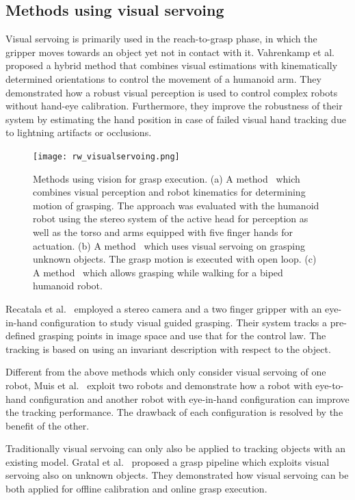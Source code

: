 \subsection{Methods using visual servoing} 
Visual servoing is primarily used in the reach-to-grasp phase, in which the gripper moves towards an object yet not in contact with it. Vahrenkamp et al.~\cite{Vahrenkamp2008} proposed a hybrid method that combines visual estimations with kinematically determined orientations to control the movement of a humanoid arm. They demonstrated how a robust visual perception is used to control complex robots without hand-eye calibration. Furthermore, they improve the robustness of their system  by estimating the hand position in case of failed visual hand tracking due to lightning artifacts or occlusions. 

\begin{figure}[!htbp]
\centering
\texttt{[image: rw\_visualservoing.png]}
\captionsetup{justification=raggedright}
\caption{Methods using vision for grasp execution. (a) A method~\cite{Vahrenkamp2008} which combines visual perception and robot kinematics for determining motion of grasping. The approach was evaluated with the humanoid robot using the stereo system of the active head for perception as well as the torso and arms equipped with five finger hands for actuation. (b) A method~\cite{Gratal2012} which uses visual servoing on grasping unknown objects. The grasp motion is executed with open loop. (c) A method~\cite{Mansard2007} which allows grasping while walking for a biped humanoid robot.}
\label{fig:rw_visualservoing}       
\end{figure} 

Recatala et al.~\cite{Recatala2004} employed a stereo camera and a two finger gripper with an eye-in-hand configuration to study visual guided grasping. Their system tracks a pre-defined grasping points in image space and use that for the control law. The tracking is based on using an invariant description with respect to the object.   

Different from the above methods which only consider visual servoing of one robot, Muis et al.~\cite{Muis2005} exploit two robots and demonstrate how a robot with eye-to-hand configuration and another robot with eye-in-hand configuration can improve the tracking performance. The drawback of each configuration is resolved by the benefit of the other.  

Traditionally visual servoing can only also be applied to tracking objects with an existing model. Gratal et al.~\cite{Gratal2012} proposed a grasp pipeline which exploits visual servoing also on unknown objects. They demonstrated how visual servoing can be both applied for offline calibration and online grasp execution. 

